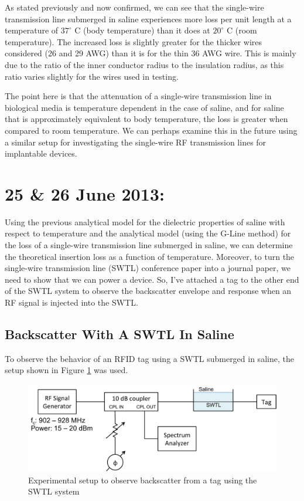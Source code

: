 \documentclass[12pt,onecolumn,titlepage]{article}
\begin{document}
As stated previously and now confirmed, we can see that the single-wire transmission line submerged in saline experiences more loss per unit length at a temperature of $37^\circ$ C (body temperature) than it does at $20^\circ$ C (room temperature). The increased loss is slightly greater for the thicker wires considered (26 and 29 AWG) than it is for the thin 36 AWG wire. This is mainly due to the ratio of the inner conductor radius to the insulation radius, as this ratio varies slightly for the wires used in testing.

The point here is that the attenuation of a single-wire transmission line in biological media is temperature dependent in the case of saline, and for saline that is approximately equivalent to body temperature, the loss is greater when compared to room temperature. We can perhaps examine this in the future using a similar setup for investigating the single-wire RF transmission lines for implantable devices.


\clearpage
\section{25 \& 26 June 2013:}

\indent \indent Using the previous analytical model for the dielectric properties of saline with respect to temperature and the analytical model (using the G-Line method) for the loss of a single-wire transmission line submerged in saline, we can determine the theoretical insertion loss as a function of temperature. Moreover, to turn the single-wire transmission line (SWTL) conference paper into a journal paper, we need to show that we can power a device. So, I've attached a tag to the other end of the SWTL system to observe the backscatter envelope and response when an RF signal is injected into the SWTL.

\subsection{Backscatter With A SWTL In Saline}
\indent \indent To observe the behavior of an RFID tag using a SWTL submerged in saline, the setup shown in Figure \ref{fig:SWTL_w_tag} was used.


\begin{figure}[htbp]
	\centering
	\includegraphics[width=\textwidth]{Pictures/25June2013/SWTL_w_tag}
	\caption{ Experimental setup to observe backscatter from a tag using the SWTL system } 
	\label{fig:SWTL_w_tag}
\end{figure}
\end{document}
